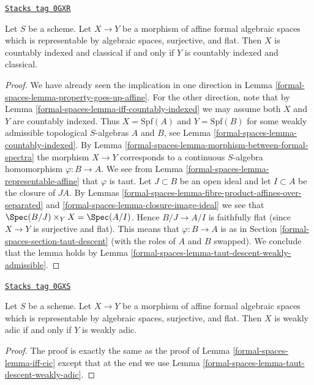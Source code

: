 \begin{lemma}
\label{formal-spaces-lemma-iff-cic}
\href{https://stacks.math.columbia.edu/tag/0GXR}{\texttt{Stacks tag 0GXR}}

Let $S$ be a scheme. Let $X \to Y$ be a morphism of affine
formal algebraic spaces which is representable by algebraic spaces,
surjective, and flat. Then $X$ is countably indexed and classical
if and only if $Y$ is countably indexed and classical.
\end{lemma}

\begin{proof}
We have already seen the implication in one direction in
Lemma \ref{formal-spaces-lemma-property-goes-up-affine}. For the other direction,
note that by Lemma \ref{formal-spaces-lemma-iff-countably-indexed} we may assume
both $X$ and $Y$ are countably indexed. Thus $X = \text{Spf}(A)$
and $Y = \text{Spf}(B)$ for some weakly admissible topological
$S$-algebras $A$ and $B$, see Lemma \ref{formal-spaces-lemma-countably-indexed}.
By Lemma \ref{formal-spaces-lemma-morphism-between-formal-spectra}
the morphism $X \to Y$ corresponds to a continuous $S$-algebra
homomorphism $\varphi : B \to A$. We see from
Lemma \ref{formal-spaces-lemma-representable-affine} that $\varphi$ is taut.
Let $J \subset B$ be an open ideal and let $I \subset A$
be the closure of $JA$. By
Lemmas \ref{formal-spaces-lemma-fibre-product-affines-over-separated} and
\ref{formal-spaces-lemma-closure-image-ideal}
we see that $\Spec(B/J) \times_Y X = \Spec(A/I)$.
Hence $B/J \to A/I$ is faithfully flat (since $X \to Y$ is surjective
and flat). This means that $\varphi : B \to A$ is as in
Section \ref{formal-spaces-section-taut-descent} (with the roles of $A$ and $B$ swapped).
We conclude that the lemma holds by
Lemma \ref{formal-spaces-lemma-taut-descent-weakly-admissible}.
\end{proof}

\begin{lemma}
\label{formal-spaces-lemma-iff-weakly-adic}
\href{https://stacks.math.columbia.edu/tag/0GXS}{\texttt{Stacks tag 0GXS}}

Let $S$ be a scheme. Let $X \to Y$ be a morphism of affine
formal algebraic spaces which is representable by algebraic spaces,
surjective, and flat. Then $X$ is weakly adic
if and only if $Y$ is weakly adic.
\end{lemma}

\begin{proof}
The proof is exactly the same as the proof of
Lemma \ref{formal-spaces-lemma-iff-cic} except that at the end we use
Lemma \ref{formal-spaces-lemma-taut-descent-weakly-adic}.
\end{proof}

